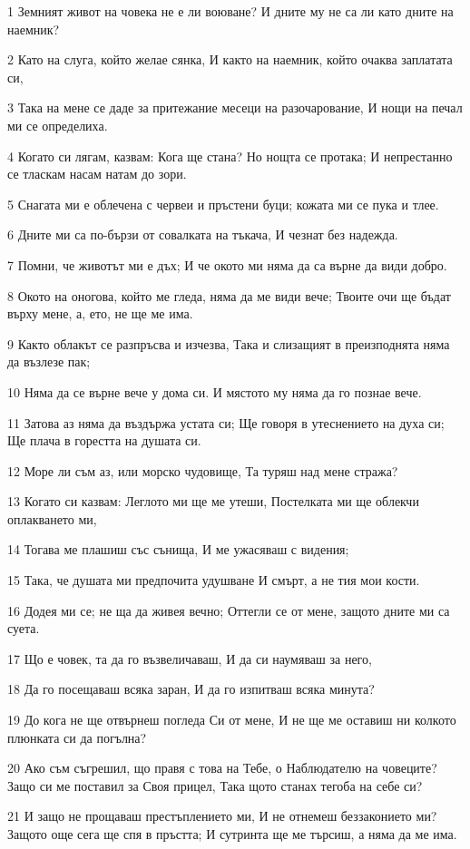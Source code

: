 \par 1 Земният живот на човека не е ли воюване? И дните му не са ли като дните на наемник?
\par 2 Като на слуга, който желае сянка, И както на наемник, който очаква заплатата си,
\par 3 Така на мене се даде за притежание месеци на разочарование, И нощи на печал ми се определиха.
\par 4 Когато си лягам, казвам: Кога ще стана? Но нощта се протака; И непрестанно се тласкам насам натам до зори.
\par 5 Снагата ми е облечена с червеи и пръстени буци; кожата ми се пука и тлее.
\par 6 Дните ми са по-бързи от совалката на тъкача, И чезнат без надежда.
\par 7 Помни, че животът ми е дъх; И че окото ми няма да са върне да види добро.
\par 8 Окото на оногова, който ме гледа, няма да ме види вече; Твоите очи ще бъдат върху мене, а, ето, не ще ме има.
\par 9 Както облакът се разпръсва и изчезва, Така и слизащият в преизподнята няма да възлезе пак;
\par 10 Няма да се върне вече у дома си. И мястото му няма да го познае вече.
\par 11 Затова аз няма да въздържа устата си; Ще говоря в утеснението на духа си; Ще плача в горестта на душата си.
\par 12 Море ли съм аз, или морско чудовище, Та туряш над мене стража?
\par 13 Когато си казвам: Леглото ми ще ме утеши, Постелката ми ще облекчи оплакването ми,
\par 14 Тогава ме плашиш със сънища, И ме ужасяваш с видения;
\par 15 Така, че душата ми предпочита удушване И смърт, а не тия мои кости.
\par 16 Додея ми се; не ща да живея вечно; Оттегли се от мене, защото дните ми са суета.
\par 17 Що е човек, та да го възвеличаваш, И да си наумяваш за него,
\par 18 Да го посещаваш всяка заран, И да го изпитваш всяка минута?
\par 19 До кога не ще отвърнеш погледа Си от мене, И не ще ме оставиш ни колкото плюнката си да погълна?
\par 20 Ако съм съгрешил, що правя с това на Тебе, о Наблюдателю на човеците? Защо си ме поставил за Своя прицел, Така щото станах тегоба на себе си?
\par 21 И защо не прощаваш престъплението ми, И не отнемеш беззаконието ми? Защото още сега ще спя в пръстта; И сутринта ще ме търсиш, а няма да ме има.

